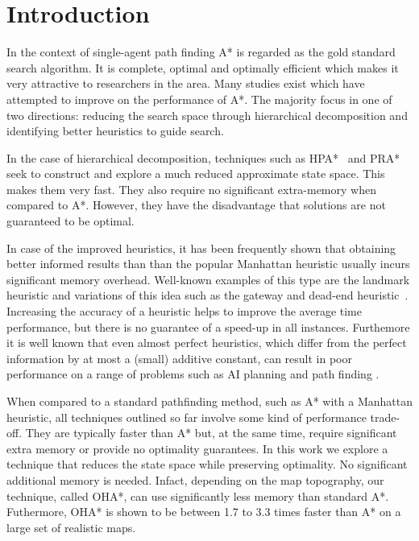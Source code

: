 \section{Introduction}
In the context of single-agent path finding A* \cite{hart68} is regarded as 
the gold standard search algorithm.
It is complete, optimal and optimally efficient which makes it very attractive 
to researchers in the area.
Many studies exist which have attempted to improve on the performance of A*. 
The majority focus in one of two directions: reducing the search space through hierarchical 
decomposition and identifying better heuristics to guide search. 
\par
In the case of hierarchical decomposition, techniques such as
HPA*~\cite{botea04} and PRA*~\cite{sturtevant05} seek to construct and explore
a much reduced approximate state space.
This makes them very fast. 
They also require no significant extra-memory when compared to A*.
However, they have the disadvantage that solutions are not guaranteed to be optimal.
\par
In case of the improved heuristics, it has been frequently shown
that obtaining better informed results than than the popular
Manhattan heuristic usually incurs significant memory overhead.
Well-known examples of this type are the landmark heuristic 
\cite{goldberg05,Cazenave:06} and variations of this idea such as the gateway and dead-end
heuristic~\cite{bjornsson06}.
Increasing the accuracy of a heuristic helps to improve the average time performance,
but there is no guarantee of a speed-up in all instances.
Furthemore it is well known that even almost perfect heuristics,
which differ from the perfect information by at most a (small) additive constant,
can result in poor performance on a range of problems such as AI planning and path finding
\cite{helmert08,pohl77}.
\par
When compared to a standard pathfinding method, such as A* with a Manhattan heuristic,
all techniques outlined so far involve some kind of performance trade-off.
They are typically faster than A* but, at the same time, require significant
extra memory or provide no optimality guarantees.
In this work we explore a technique that reduces the state space while preserving optimality.
No significant additional memory is needed. 
Infact, depending on the map topography, our technique, called OHA*, 
can use significantly less memory than standard A*.
Futhermore, OHA* is shown to be between 1.7 to 3.3 
times faster than A* on a large set of realistic maps.

